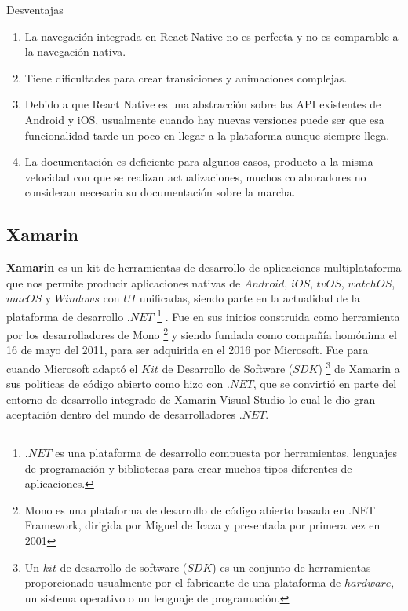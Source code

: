 Desventajas
\begin{enumerate}



\item	La navegación integrada en React Native no es perfecta y no es comparable a la navegación nativa.
\item	Tiene dificultades para crear transiciones y animaciones complejas.
\item	Debido a que React Native es una abstracción sobre las API existentes de Android y iOS, usualmente cuando hay nuevas versiones puede ser que esa funcionalidad tarde un poco en llegar a la plataforma aunque siempre llega.
\item La documentación es deficiente para algunos casos, producto a la misma velocidad con que se realizan actualizaciones, muchos colaboradores no consideran necesaria su documentación sobre la marcha.
\end{enumerate}



\subsection{Xamarin}\label{chapter:introduction}

\textbf{Xamarin}  es un kit de herramientas de desarrollo de aplicaciones multiplataforma que nos permite producir aplicaciones nativas de $Android$, $iOS$, $tvOS$, $watchOS$, $macOS$ y $Windows$ con $UI$ unificadas, siendo parte en la actualidad de la plataforma de desarrollo $.NET$  \footnote{$.NET$ es una plataforma de desarrollo compuesta por herramientas, lenguajes de programación y bibliotecas para crear muchos tipos diferentes de aplicaciones.} . Fue en sus inicios construida como herramienta por los desarrolladores de Mono \footnote{Mono es una plataforma de desarrollo de código abierto basada en .NET Framework, dirigida por Miguel de Icaza y presentada por primera vez en 2001}  y siendo fundada como compañía homónima el 16 de mayo del 2011, para ser adquirida en el 2016 por Microsoft.
Fue para cuando Microsoft adaptó el $Kit$ de Desarrollo de Software ($SDK$) \footnote{Un $kit$ de desarrollo de software ($SDK$) es un conjunto de herramientas proporcionado usualmente por el fabricante de una plataforma de $hardware$, un sistema operativo o un lenguaje de programación.} de Xamarin a sus políticas de código abierto como hizo con $.NET$, que se convirtió en parte del entorno de desarrollo integrado de Xamarin Visual Studio lo cual le dio gran aceptación dentro del mundo de desarrolladores $.NET$.

